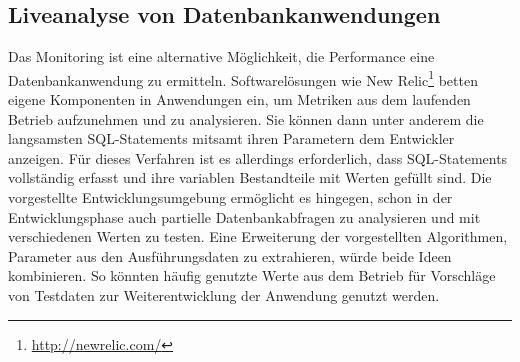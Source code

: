 \subsection{Liveanalyse von Datenbankanwendungen}
Das Monitoring ist eine alternative Möglichkeit, die Performance eine Datenbankanwendung zu ermitteln.
Softwarelösungen wie New Relic\footnote{\url{http://newrelic.com/}} betten eigene Komponenten in Anwendungen ein, um Metriken aus dem laufenden Betrieb aufzunehmen und zu analysieren.
Sie können dann unter anderem die langsamsten SQL-Statements mitsamt ihren Parametern dem Entwickler anzeigen.
Für dieses Verfahren ist es allerdings erforderlich, dass SQL-Statements vollständig erfasst und ihre variablen Bestandteile mit Werten gefüllt sind.
Die vorgestellte Entwicklungsumgebung ermöglicht es hingegen, schon in der Entwicklungsphase auch partielle Datenbankabfragen zu analysieren und mit verschiedenen Werten zu testen.
Eine Erweiterung der vorgestellten Algorithmen, Parameter aus den Ausführungsdaten zu extrahieren, würde beide Ideen kombinieren.
So könnten häufig genutzte Werte aus dem Betrieb für Vorschläge von Testdaten zur Weiterentwicklung der Anwendung genutzt werden.

